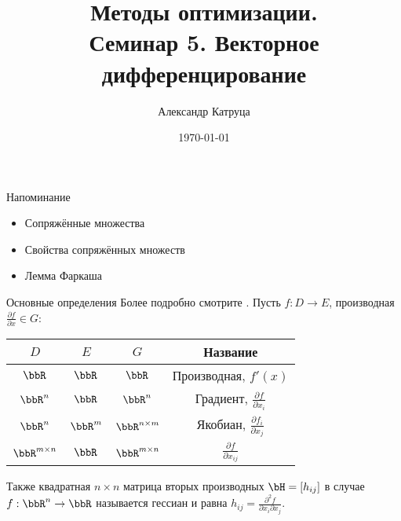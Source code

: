 \documentclass[12pt]{beamer}
\title[Семинар 5]{Методы оптимизации. \\
 Семинар 5. Векторное дифференцирование}
\author{Александр Катруца}
\institute{Московский физико-технический институт\\
Факультет Управления и Прикладной Математики}
\date{\today}
\begin{document}
\begin{frame}
\maketitle
\end{frame}

\begin{frame}{Напоминание}
\begin{itemize}
\item Сопряжённые множества
\item Свойства сопряжённых множеств
\item Лемма Фаркаша
\end{itemize}
\end{frame}

\begin{frame}{Основные определения}
Более подробно смотрите \href{https://en.wikipedia.org/wiki/Matrix_calculus}{}.
Пусть $f: D \rightarrow E$, производная $\frac{\partial f}{\partial x} \in G$:
\begin{table}[!h]
\centering
\begin{tabular}{|c|c|c|c|}
\hline
$D$ & $E$ & $G$ & Название\\
\hline
$\bbR$ & $\bbR$ & $\bbR$ & Производная, $f'(x)$\\
\hline
$\bbR^n$ & $\bbR$ & $\bbR^n$ & Градиент, $\frac{\partial f}{\partial x_i}$\\
\hline
$\bbR^n$ & $\bbR^m$ & $\bbR^{n \times m}$ & Якобиан, $\frac{\partial f_i}{\partial x_j}$ \\
\hline
$\bbR^{m \times n}$ & $\bbR$ & $\bbR^{m \times n}$ & $\frac{\partial f}{\partial x_{ij}}$\\
\hline
\end{tabular}
\end{table}

Также квадратная $n \times n$ матрица вторых производных $\bH = [h_{ij}]$ в случае $f: \bbR^n \rightarrow \bbR$ называется гессиан и равна $h_{ij} = \frac{\partial^2 f}{\partial x_i \partial x_j}$.
\end{frame}
\end{document}
